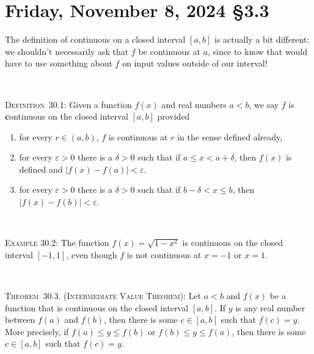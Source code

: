 \documentclass[12pt]{amsart}
\def\de{\delta}
\def\Fr{Friday}
\def\e{\varepsilon}
\numberwithin{equation}{section}
\theoremstyle{plain} %
\newcommand{\Nov}[3]{\section{#2, November #1, 2024 \quad \S#3}}
\theoremstyle{definition}
\theoremstyle{remark}
\begin{document}
   \newpage
   
   
   \Nov{8}{\Fr}{3.3}
   
   \begin{framed} 
 \noindent The definition of continuous on a closed interval $[a,b]$ is actually a bit different: we shouldn't necessarily ask that $f$ be continuous at $a$, since to know that would have to use something about $f$ on input values outside of our interval!
 
 \
 
\noindent\textsc{Definition~30.1:}  Given a function $f(x)$ and real numbers $a < b$,
we say $f$ is {\textbf continuous on the closed interval $[a,b]$} provided 
\begin{enumerate}
\item for every $r \in (a,b)$, $f$ is  continuous at $r$ in the sense defined already,
\item for every $\e > 0$ there is a $\de > 0$ such that if $a \leq x < a+\de$, then $f(x)$ is defined and ${|f(x)
  - f(a)| < \e}$.
\item for every $\e > 0$ there is a $\de > 0$ such that if $b -\de < x \leq b$, then ${|f(x)
  - f(b)| < \e}$.
\end{enumerate}

\

\noindent\textsc{Example 30.2:} The function $f(x)=\sqrt{1-x^2}$ is continuous on the closed interval $[-1,1]$, even though $f$ is not continuous at $x=-1$ or $x=1$.

\

\noindent\textsc{Theorem~30.3. (Intermediate Value Theorem):}  Let $a<b$ and $f(x)$ be a function that is continuous on the closed interval $[a,b]$. If $y$ is any real number between $f(a)$ and $f(b)$, then there is some $c\in [a,b]$ such that $f(c)=y$. More precisely, if $f(a) \leq y \leq f(b)$ or $f(b) \leq y \leq f(a)$, then there is some $c\in [a,b]$ such that $f(c)=y$.
\end{framed}


\
\end{document}
